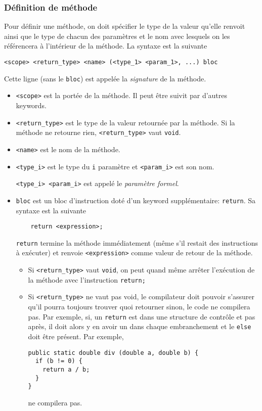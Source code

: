 \subsubsection{Définition de méthode}
Pour définir une méthode, on doit spécifier le type de la valeur
qu'elle renvoit ainsi que le type de chacun des paramètres et le nom
avec lesquels on les référencera à l'intérieur de la méthode.
La syntaxe est la suivante
\begin{lstlisting}
<scope> <return_type> <name> (<type_1> <param_1>, ...) bloc
\end{lstlisting}
Cette ligne (sans le \verb|bloc|) est appelée la \emph{signature} de la méthode.
\begin{itemize}
  \item \verb|<scope>| est la portée de la méthode. Il peut être
    suivit par d'autres keywords.
  \item \verb|<return_type>| est le type de la valeur retournée par
    la méthode.
    Si la méthode ne retourne rien, \verb|<return_type>| vaut \verb|void|.
  \item \verb|<name>| est le nom de la méthode.
  \item \verb|<type_i>| est le type du \verb|i|\ieme{} paramètre et
    \verb|<param_i>| est son nom.

    \verb|<type_i> <param_i>| est appelé le \emph{paramètre formel}.
  \item \verb|bloc| est un bloc d'instruction doté d'un keyword supplémentaire:
    \verb|return|. Sa syntaxe est la suivante
    \begin{lstlisting}
    return <expression>;
    \end{lstlisting}
    \verb|return| termine la méthode immédiatement
    (même s'il restait des instructions à exécuter) et
    renvoie \verb|<expression>| comme valeur de retour de la méthode.
    \begin{itemize}
      \item
        Si \verb|<return_type>| vaut \verb|void|, on peut quand même
        arrêter l'exécution de la méthode avec l'instruction \verb|return;|
      \item
        Si \verb|<return_type>| ne vaut pas void,
        le compilateur doit pouvoir s'assurer qu'il pourra toujours
        trouver quoi retourner sinon, le code ne compilera pas.
        Par exemple, si, un \verb|return| est dans une structure de contrôle
        et pas après, il doit alors y en avoir un dans chaque embranchement
        et le \verb|else| doit être présent.
        Par exemple,
        \begin{lstlisting}
public static double div (double a, double b) {
  if (b != 0) {
    return a / b;
  }
}
        \end{lstlisting}
        ne compilera pas.
    \end{itemize}
\end{itemize}

